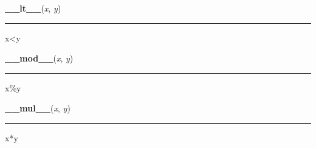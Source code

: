     \vspace{0.5ex}

\hspace{.8\funcindent}\begin{boxedminipage}{\funcwidth}

    \raggedright \textbf{\_\_lt\_\_}(\textit{x}, \textit{y})

    \vspace{-1.5ex}

    \rule{\textwidth}{0.5\fboxrule}
\setlength{\parskip}{2ex}
    x{\textless}y

\setlength{\parskip}{1ex}
    \end{boxedminipage}

    \label{pygame:Color:__mod__}

    \vspace{0.5ex}

\hspace{.8\funcindent}\begin{boxedminipage}{\funcwidth}

    \raggedright \textbf{\_\_mod\_\_}(\textit{x}, \textit{y})

    \vspace{-1.5ex}

    \rule{\textwidth}{0.5\fboxrule}
\setlength{\parskip}{2ex}
    x\%y

\setlength{\parskip}{1ex}
    \end{boxedminipage}

    \label{pygame:Color:__mul__}

    \vspace{0.5ex}

\hspace{.8\funcindent}\begin{boxedminipage}{\funcwidth}

    \raggedright \textbf{\_\_mul\_\_}(\textit{x}, \textit{y})

    \vspace{-1.5ex}

    \rule{\textwidth}{0.5\fboxrule}
\setlength{\parskip}{2ex}
    x*y

\setlength{\parskip}{1ex}
    \end{boxedminipage}

    \label{pygame:Color:__ne__}

    \vspace{0.5ex}

